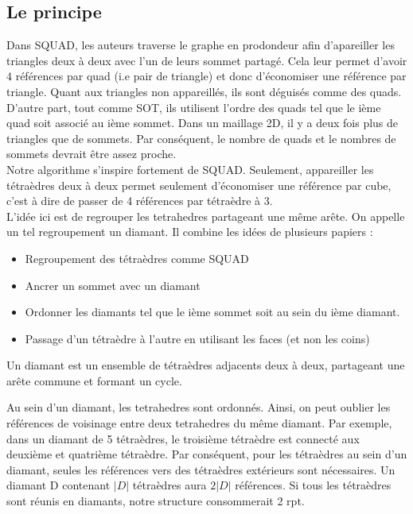 \documentclass[a4paper,11pt,openany]{article}
\begin{document}
\subsection{Le principe}
\noindent
Dans SQUAD, les auteurs traverse le graphe en prodondeur afin d'apareiller les triangles deux à deux avec l'un de leurs sommet partagé. Cela leur permet d'avoir 4 références par quad (i.e pair de triangle) et donc d'économiser une référence par triangle. Quant aux triangles non appareillés, ils sont déguisés comme des quads. D'autre part, tout comme SOT, ils utilisent l'ordre des quads tel que le ième quad soit associé au ième sommet. Dans un maillage 2D, il y a deux fois plus de triangles que de sommets. Par conséquent, le nombre de quads et le nombres de sommets devrait être assez proche.\\
Notre algorithme s'inspire fortement de SQUAD. Seulement, appareiller les tétraèdres deux à deux permet seulement d'économiser une référence par cube, c'est à dire de passer de 4 références par tétraèdre à 3.\\
L'idée ici est de regrouper les tetrahedres partageant une même arête. On appelle un tel regroupement un diamant. Il combine les idées de plusieurs papiers :
\begin{itemize}
\item Regroupement des tétraèdres comme SQUAD
\item Ancrer un sommet avec un diamant
\item Ordonner les diamants tel que le ième sommet soit au sein du ième diamant.
\item Passage d'un tétraèdre à l'autre en utilisant les faces (et non les coins)
\end{itemize}
Un diamant est un ensemble de tétraèdres adjacents deux à deux, partageant une arête commune et formant un cycle. 
\begin{figure}[H]
\begin{center}
\end{center}
\end{figure}
\noindent
Au sein d'un diamant, les tetrahedres sont ordonnés. Ainsi, on peut oublier les références de voisinage entre deux tetrahedres du même diamant. Par exemple, dans un diamant de 5 tétraèdres, le troisième tétraèdre est connecté aux deuxième et quatrième tétraèdre. Par conséquent, pour les tétraèdres au sein d'un diamant, seules les références vers des tétraèdres extérieurs sont nécessaires. Un diamant D contenant $|D|$ tétraèdres aura $2|D|$ références. Si tous les tétraèdres sont réunis en diamants, notre structure consommerait 2 rpt.
\end{document}
